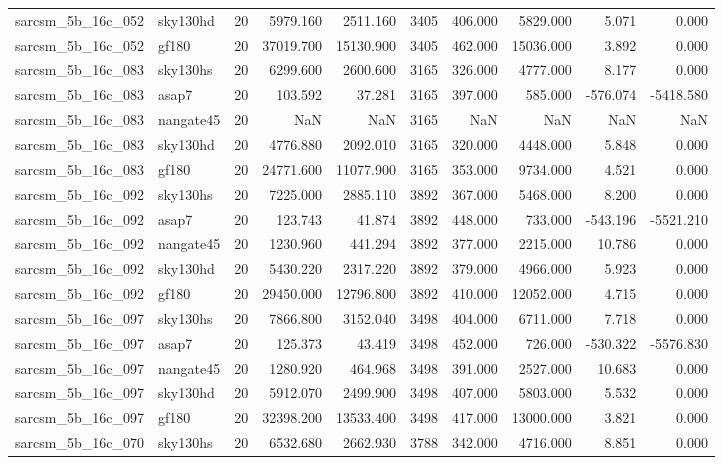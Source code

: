 \begin{tabular}{llrrrrrrrr}
sarcsm\_5b\_16c\_052 & sky130hd & 20 & 5979.160 & 2511.160 & 3405 & 406.000 & 5829.000 & 5.071 & 0.000 \\
sarcsm\_5b\_16c\_052 & gf180 & 20 & 37019.700 & 15130.900 & 3405 & 462.000 & 15036.000 & 3.892 & 0.000 \\
sarcsm\_5b\_16c\_083 & sky130hs & 20 & 6299.600 & 2600.600 & 3165 & 326.000 & 4777.000 & 8.177 & 0.000 \\
sarcsm\_5b\_16c\_083 & asap7 & 20 & 103.592 & 37.281 & 3165 & 397.000 & 585.000 & -576.074 & -5418.580 \\
sarcsm\_5b\_16c\_083 & nangate45 & 20 & NaN & NaN & 3165 & NaN & NaN & NaN & NaN \\
sarcsm\_5b\_16c\_083 & sky130hd & 20 & 4776.880 & 2092.010 & 3165 & 320.000 & 4448.000 & 5.848 & 0.000 \\
sarcsm\_5b\_16c\_083 & gf180 & 20 & 24771.600 & 11077.900 & 3165 & 353.000 & 9734.000 & 4.521 & 0.000 \\
sarcsm\_5b\_16c\_092 & sky130hs & 20 & 7225.000 & 2885.110 & 3892 & 367.000 & 5468.000 & 8.200 & 0.000 \\
sarcsm\_5b\_16c\_092 & asap7 & 20 & 123.743 & 41.874 & 3892 & 448.000 & 733.000 & -543.196 & -5521.210 \\
sarcsm\_5b\_16c\_092 & nangate45 & 20 & 1230.960 & 441.294 & 3892 & 377.000 & 2215.000 & 10.786 & 0.000 \\
sarcsm\_5b\_16c\_092 & sky130hd & 20 & 5430.220 & 2317.220 & 3892 & 379.000 & 4966.000 & 5.923 & 0.000 \\
sarcsm\_5b\_16c\_092 & gf180 & 20 & 29450.000 & 12796.800 & 3892 & 410.000 & 12052.000 & 4.715 & 0.000 \\
sarcsm\_5b\_16c\_097 & sky130hs & 20 & 7866.800 & 3152.040 & 3498 & 404.000 & 6711.000 & 7.718 & 0.000 \\
sarcsm\_5b\_16c\_097 & asap7 & 20 & 125.373 & 43.419 & 3498 & 452.000 & 726.000 & -530.322 & -5576.830 \\
sarcsm\_5b\_16c\_097 & nangate45 & 20 & 1280.920 & 464.968 & 3498 & 391.000 & 2527.000 & 10.683 & 0.000 \\
sarcsm\_5b\_16c\_097 & sky130hd & 20 & 5912.070 & 2499.900 & 3498 & 407.000 & 5803.000 & 5.532 & 0.000 \\
sarcsm\_5b\_16c\_097 & gf180 & 20 & 32398.200 & 13533.400 & 3498 & 417.000 & 13000.000 & 3.821 & 0.000 \\
sarcsm\_5b\_16c\_070 & sky130hs & 20 & 6532.680 & 2662.930 & 3788 & 342.000 & 4716.000 & 8.851 & 0.000 \\

\end{tabular}
